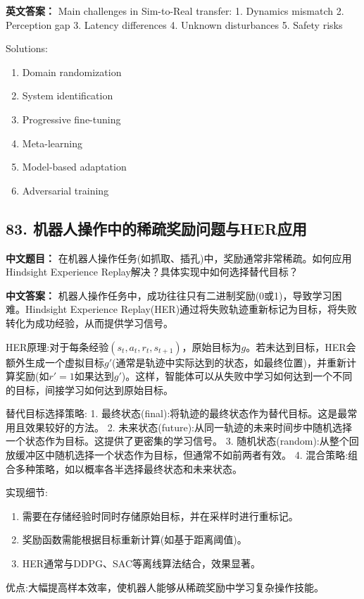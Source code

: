 \documentclass[10pt,a4paper]{ctexart}
\begin{document}
\textbf{英文答案：}  
Main challenges in Sim-to-Real transfer:
1. Dynamics mismatch
2. Perception gap
3. Latency differences
4. Unknown disturbances
5. Safety risks

Solutions:
\begin{enumerate}
    \item Domain randomization
    \item System identification
    \item Progressive fine-tuning
    \item Meta-learning
    \item Model-based adaptation
    \item Adversarial training
\end{enumerate}

\subsection*{83. 机器人操作中的稀疏奖励问题与HER应用}
\textbf{中文题目：} 在机器人操作任务(如抓取、插孔)中，奖励通常非常稀疏。如何应用Hindsight Experience Replay解决？具体实现中如何选择替代目标？

\textbf{中文答案：}  
机器人操作任务中，成功往往只有二进制奖励(0或1)，导致学习困难。Hindsight Experience Replay(HER)通过将失败轨迹重新标记为目标，将失败转化为成功经验，从而提供学习信号。

 HER原理:对于每条经验\((s_t, a_t, r_t, s_{t+1})\)，原始目标为\(g\)。若未达到目标，HER会额外生成一个虚拟目标\(g'\)(通常是轨迹中实际达到的状态，如最终位置)，并重新计算奖励(如\(r' = 1\)如果达到\(g'\))。这样，智能体可以从失败中学习如何达到一个不同的目标，间接学习如何达到原始目标。

 替代目标选择策略:
1.  最终状态(final):将轨迹的最终状态作为替代目标。这是最常用且效果较好的方法。
2.  未来状态(future):从同一轨迹的未来时间步中随机选择一个状态作为目标。这提供了更密集的学习信号。
3.  随机状态(random):从整个回放缓冲区中随机选择一个状态作为目标，但通常不如前两者有效。
4.  混合策略:组合多种策略，如以概率各半选择最终状态和未来状态。

 实现细节:
\begin{enumerate}
    \item 需要在存储经验时同时存储原始目标，并在采样时进行重标记。
    \item 奖励函数需能根据目标重新计算(如基于距离阈值)。
    \item HER通常与DDPG、SAC等离线算法结合，效果显著。
\end{enumerate}

 优点:大幅提高样本效率，使机器人能够从稀疏奖励中学习复杂操作技能。
\end{document}

